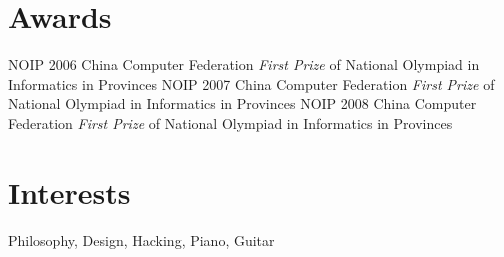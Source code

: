 \documentclass[]{friggeri-cv} %
\begin{document}

\section{Awards}

\begin{entrylist}
  {NOIP 2006}
  {China Computer Federation}
  {\emph{First Prize} of National Olympiad in Informatics in Provinces}
  {NOIP 2007}
  {China Computer Federation}
  {\emph{First Prize} of National Olympiad in Informatics in Provinces}
  {NOIP 2008}
  {China Computer Federation}
  {\emph{First Prize} of National Olympiad in Informatics in Provinces}
\end{entrylist}


\section{Interests}

Philosophy, Design, Hacking, Piano, Guitar
\end{document}
